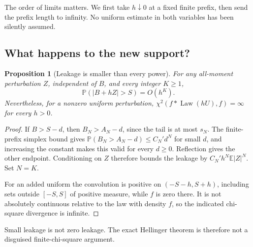 \documentclass[11pt,a4paper]{article}
\numberwithin{equation}{section}
\newtheorem{proposition}[theorem]{Proposition}
\theoremstyle{definition}
\theoremstyle{remark}
\DeclareMathOperator{\Law}{Law}
\newcommand{\E}{\mathbb E}
\newcommand{\Prob}{\mathbb P}
\begin{document}
The order of limits matters. We first take $h\downarrow0$ at a fixed finite
prefix, then send the prefix length to infinity. No uniform estimate in both
variables has been silently assumed.

\subsection{What happens to the new support?}
\begin{proposition}[Leakage is smaller than every power]
\label{prop:leakage}
For any all-moment perturbation $Z$, independent of $B$, and every integer
$K\ge1$,
\begin{equation}
 \Prob(|B+hZ|>S)=O(h^K).
 \label{eq:leakage}
\end{equation}
Nevertheless, for a nonzero uniform perturbation,
$\chi^2(f*\Law(hU),f)=\infty$ for every $h>0$.
\end{proposition}
\begin{proof}
If $B>S-d$, then $B_N>A_N-d$, since the tail is at most $s_N$.
The finite-prefix simplex bound gives
$\Prob(B_N>A_N-d)\le C_N' d^N$ for small $d$, and increasing the constant
makes this valid for every $d\ge0$. Reflection gives the other endpoint.
Conditioning on $Z$ therefore bounds the leakage by
$C_N' h^N\E|Z|^N$. Set $N=K$.

For an added uniform the convolution is positive on $(-S-h,S+h)$, including
sets outside $[-S,S]$ of positive measure, while $f$ is zero there. It is not
absolutely continuous relative to the law with density $f$, so the indicated
chi-square divergence is infinite.
\end{proof}
Small leakage is not zero leakage. The exact Hellinger theorem is therefore
not a disguised finite-chi-square argument.
\end{document}
